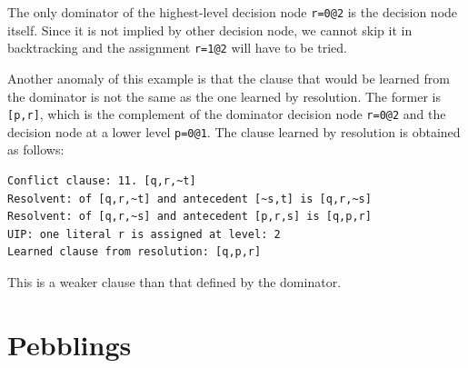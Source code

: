 \documentclass[11pt]{report}
\begin{document}
The only dominator of the highest-level decision node \verb+r=0@2+ is
the decision node itself. Since it is not implied by other decision
node, we cannot skip it in backtracking and the assignment \verb+r=1@2+
will have to be tried.

Another anomaly of this example is that the clause that would be learned
from the dominator is not the same as the one learned by resolution. The
former is \verb+[p,r]+, which is the complement of the dominator
decision node \verb+r=0@2+ and the decision node at a lower level
\verb+p=0@1+. The clause learned by resolution is obtained as follows:

\begin{verbatim}
Conflict clause: 11. [q,r,~t]
Resolvent: of [q,r,~t] and antecedent [~s,t] is [q,r,~s]
Resolvent: of [q,r,~s] and antecedent [p,r,s] is [q,p,r]
UIP: one literal r is assigned at level: 2
Learned clause from resolution: [q,p,r]
\end{verbatim}

This is a weaker clause than that defined by the dominator.

\chapter{Pebblings}\label{ch.pebbling}



\end{document}
